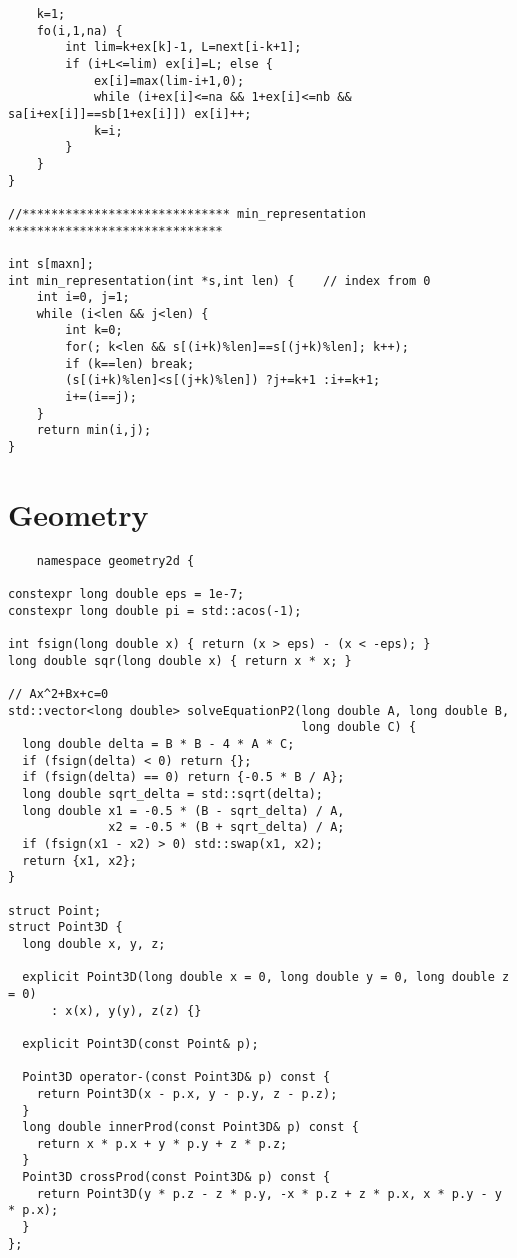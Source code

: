 \documentclass[6pt]{article}
\begin{document}
\begin{multicols}{2}
\begin{lstlisting}
    k=1;
    fo(i,1,na) {
        int lim=k+ex[k]-1, L=next[i-k+1];
        if (i+L<=lim) ex[i]=L; else {
            ex[i]=max(lim-i+1,0);
            while (i+ex[i]<=na && 1+ex[i]<=nb && sa[i+ex[i]]==sb[1+ex[i]]) ex[i]++;
            k=i;
        }
    }
}

//***************************** min_representation ******************************

int s[maxn];
int min_representation(int *s,int len) {    // index from 0
    int i=0, j=1;
    while (i<len && j<len) {
        int k=0;
        for(; k<len && s[(i+k)%len]==s[(j+k)%len]; k++);
        if (k==len) break;
        (s[(i+k)%len]<s[(j+k)%len]) ?j+=k+1 :i+=k+1;
        i+=(i==j);
    }
    return min(i,j);
}
\end{lstlisting}

  \section{Geometry}

  \begin{lstlisting}
    namespace geometry2d {

constexpr long double eps = 1e-7;
constexpr long double pi = std::acos(-1);

int fsign(long double x) { return (x > eps) - (x < -eps); }
long double sqr(long double x) { return x * x; }

// Ax^2+Bx+c=0
std::vector<long double> solveEquationP2(long double A, long double B,
                                         long double C) {
  long double delta = B * B - 4 * A * C;
  if (fsign(delta) < 0) return {};
  if (fsign(delta) == 0) return {-0.5 * B / A};
  long double sqrt_delta = std::sqrt(delta);
  long double x1 = -0.5 * (B - sqrt_delta) / A,
              x2 = -0.5 * (B + sqrt_delta) / A;
  if (fsign(x1 - x2) > 0) std::swap(x1, x2);
  return {x1, x2};
}

struct Point;
struct Point3D {
  long double x, y, z;

  explicit Point3D(long double x = 0, long double y = 0, long double z = 0)
      : x(x), y(y), z(z) {}

  explicit Point3D(const Point& p);

  Point3D operator-(const Point3D& p) const {
    return Point3D(x - p.x, y - p.y, z - p.z);
  }
  long double innerProd(const Point3D& p) const {
    return x * p.x + y * p.y + z * p.z;
  }
  Point3D crossProd(const Point3D& p) const {
    return Point3D(y * p.z - z * p.y, -x * p.z + z * p.x, x * p.y - y * p.x);
  }
};


\end{lstlisting}
\end{multicols}
\end{document}
